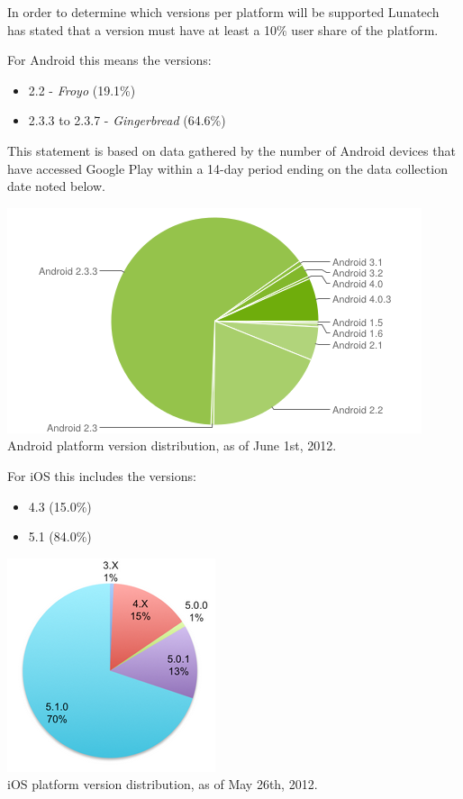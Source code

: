 In order to determine which versions per platform will be supported Lunatech has stated that a version must have at least a 10\% user share of the platform. 

\noindent For Android this means the versions:
\begin{itemize}
\item 2.2 - \emph{Froyo} (19.1\%)
\item 2.3.3 to 2.3.7 - \emph{Gingerbread} (64.6\%)
\end{itemize}
This statement is based on data gathered by the number of Android devices that have accessed Google Play within a 14-day period ending on the data collection date noted below.
\begin{centering}
\includegraphics[scale=0.35]{images/androidversionchart.png}\\{Android platform version distribution, as of June 1st, 2012.\cite{GoogleAndroid2012}}\\
\end{centering}

\noindent For iOS this includes the versions:
\begin{itemize}
\item 4.3 (15.0\%)
\item 5.1 (84.0\%)
\end{itemize}
\begin{centering}
\includegraphics[scale=0.35]{images/iosversionchart.png}\\{iOS platform version distribution, as of May 26th, 2012.\cite{Sylvain2012}}\\
\end{centering}



